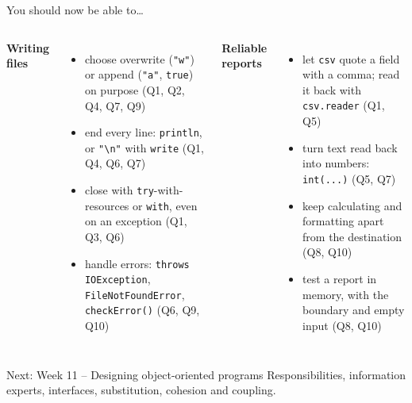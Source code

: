 \documentclass[aspectratio=169]{beamer}
\newcommand{\code}[1]{\texttt{#1}}
\newcommand{\neutrallabel}[1]{\textcolor{bkblue}{\textbf{#1}}}
\newcommand{\yes}{\textcolor{goodgreen}{\ding{51}}}
\begin{document}
\begin{frame}{You should now be able to\ldots}
  \begin{columns}[T,onlytextwidth]
    \neutrallabel{Writing files}
    \begin{itemize}[itemsep=0.12em]
      \small
      \item[\yes] choose overwrite (\code{"w"}) or append (\code{"a"}, \code{true})
            on purpose (Q1, Q2, Q4, Q7, Q9)
      \item[\yes] end every line: \code{println}, or \code{"\textbackslash n"} with
            \code{write} (Q1, Q4, Q6, Q7)
      \item[\yes] close with \code{try}-with-resources or \code{with}, even on an
            exception (Q1, Q3, Q6)
      \item[\yes] handle errors: \code{throws IOException},
            \code{FileNotFoundError}, \code{checkError()} (Q6, Q9, Q10)
    \end{itemize}
    \neutrallabel{Reliable reports}
    \begin{itemize}[itemsep=0.12em]
      \small
      \item[\yes] let \code{csv} quote a field with a comma; read it back with
            \code{csv.reader} (Q1, Q5)
      \item[\yes] turn text read back into numbers: \code{int(...)} (Q5, Q7)
      \item[\yes] keep calculating and formatting apart from the destination
            (Q8, Q10)
      \item[\yes] test a report in memory, with the boundary and empty input
            (Q8, Q10)
    \end{itemize}
  \end{columns}
  \vspace{0.3em}
  \begin{contextbox}{Next: Week 11 -- Designing object-oriented programs}
    \footnotesize Responsibilities, information experts, interfaces, substitution,
    cohesion and coupling.
  \end{contextbox}
\end{frame}
\end{document}
